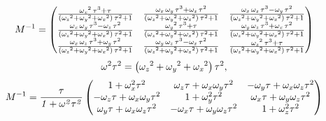 \documentclass[12pt]{article} %
\begin{document}
\begin{equation*} %
 M^{-1} = 
\ifx\endpmatrix\undefined\pmatrix{\else\begin{pmatrix}\fi {{
 {\it \omega_{x}}^2\,\tau^3+\tau}\over{\left({\it \omega_{z}}^2+
 {\it \omega_{y}}^2+{\it \omega_{x}}^2\right)\,\tau^2+1}}&{{
 {\it \omega_{x}}\,{\it \omega_{y}}\,\tau^3+{\it \omega_{z}}\,\tau^2}\over{
 \left({\it \omega_{z}}^2+{\it \omega_{y}}^2+{\it \omega_{x}}^2\right)\,
 \tau^2+1}}&{{{\it \omega_{x}}\,{\it \omega_{z}}\,\tau^3-{\it \omega_{y}}\,
 \tau^2}\over{\left({\it \omega_{z}}^2+{\it \omega_{y}}^2+{\it \omega_{x}}^
 2\right)\,\tau^2+1}}\cr {{{\it \omega_{x}}\,{\it \omega_{y}}\,\tau^3-
 {\it \omega_{z}}\,\tau^2}\over{\left({\it \omega_{z}}^2+{\it \omega_{y}}^2
 +{\it \omega_{x}}^2\right)\,\tau^2+1}}&{{{\it \omega_{y}}^2\,\tau^3+\tau
 }\over{\left({\it \omega_{z}}^2+{\it \omega_{y}}^2+{\it \omega_{x}}^2
 \right)\,\tau^2+1}}&{{{\it \omega_{y}}\,{\it \omega_{z}}\,\tau^3+
 {\it \omega_{x}}\,\tau^2}\over{\left({\it \omega_{z}}^2+{\it \omega_{y}}^2
 +{\it \omega_{x}}^2\right)\,\tau^2+1}}\cr {{{\it \omega_{x}}\,
 {\it \omega_{z}}\,\tau^3+{\it \omega_{y}}\,\tau^2}\over{\left(
 {\it \omega_{z}}^2+{\it \omega_{y}}^2+{\it \omega_{x}}^2\right)\,\tau^2+1
 }}&{{{\it \omega_{y}}\,{\it \omega_{z}}\,\tau^3-{\it \omega_{x}}\,\tau^2
 }\over{\left({\it \omega_{z}}^2+{\it \omega_{y}}^2+{\it \omega_{x}}^2
 \right)\,\tau^2+1}}&{{{\it \omega_{z}}^2\,\tau^3+\tau}\over{\left(
 {\it \omega_{z}}^2+{\it \omega_{y}}^2+{\it \omega_{x}}^2\right)\,\tau^2+1
 }}\cr \ifx\endpmatrix\undefined}\else\end{pmatrix}\fi 
\end{equation*}
\begin{equation*} 
\omega^{2}\tau^{2} = \left(
{
{\it \omega_{z}}^2 + 
{\it \omega_{y}}^2 +
{\it \omega_{x}}^2}
\right) 
\tau^2, 
\end{equation*}
\begin{equation*} 
 M^{-1} =  {\it \frac{\tau}{1 + \omega^2\tau^2}}
\begin{pmatrix} 
1 + \omega_{x}^2 \tau^2                           & \omega_{z} \tau  + \omega_{x} \omega_{y} \tau^2 & - \omega_{y} \tau + \omega_{x} \omega_{z} \tau^2 \cr
- \omega_{z} \tau + \omega_{x} \omega_{y} \tau^2  & 1 + \omega_{y}^2 \tau^2                         &   \omega_{x} \tau + \omega_{y} \omega_{z} \tau^2 \cr
  \omega_{y} \tau + \omega_{x} \omega_{z} \tau^2  & - \omega_{x}\tau + \omega_{y} \omega_{z} \tau^2 & 1 + \omega_{z}^2 \tau^2              \cr           
\end{pmatrix}
\end{equation*}
\end{document}
